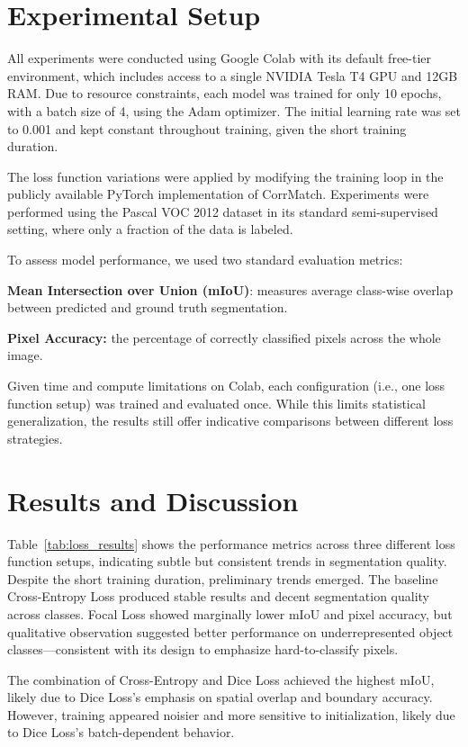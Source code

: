 \documentclass[10pt,twocolumn,letterpaper]{article}
\begin{document}
\section{Experimental Setup}
All experiments were conducted using Google Colab with its default free-tier environment, which includes access to a single NVIDIA Tesla T4 GPU and 12GB RAM. Due to resource constraints, each model was trained for only 10 epochs, with a batch size of 4, using the Adam optimizer. The initial learning rate was set to 0.001 and kept constant throughout training, given the short training duration.

The loss function variations were applied by modifying the training loop in the publicly available PyTorch implementation of CorrMatch. Experiments were performed using the Pascal VOC 2012 dataset in its standard semi-supervised setting, where only a fraction of the data is labeled.

To assess model performance, we used two standard evaluation metrics:

\textbf{Mean Intersection over Union (mIoU)}: measures average class-wise overlap between predicted and ground truth segmentation.

\textbf    {Pixel Accuracy:} the percentage of correctly classified pixels across the whole image.

Given time and compute limitations on Colab, each configuration (i.e., one loss function setup) was trained and evaluated once. While this limits statistical generalization, the results still offer indicative comparisons between different loss strategies.

\section{Results and Discussion}


Table~\ref{tab:loss_results} shows the performance metrics across three different loss function setups, indicating subtle but consistent trends in segmentation quality. Despite the short training duration, preliminary trends emerged. The baseline Cross-Entropy Loss produced stable results and decent segmentation quality across classes. Focal Loss showed marginally lower mIoU and pixel accuracy, but qualitative observation suggested better performance on underrepresented object classes—consistent with its design to emphasize hard-to-classify pixels.

The combination of Cross-Entropy and Dice Loss achieved the highest mIoU, likely due to Dice Loss's emphasis on spatial overlap and boundary accuracy. However, training appeared noisier and more sensitive to initialization, likely due to Dice Loss’s batch-dependent behavior.
\end{document}

